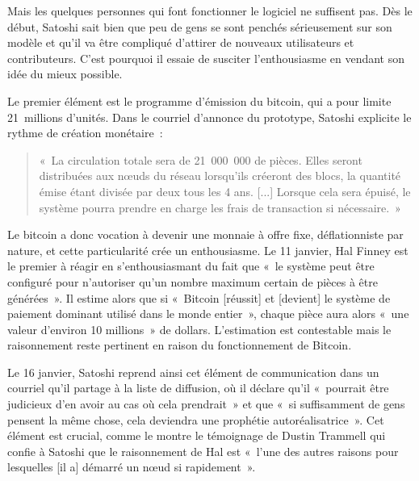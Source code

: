 

Mais les quelques personnes qui font fonctionner le logiciel ne suffisent pas. Dès le début, Satoshi sait bien que peu de gens se sont penchés sérieusement sur son modèle et qu'il va être compliqué d'attirer de nouveaux utilisateurs et contributeurs. C'est pourquoi il essaie de susciter l'enthousiasme en vendant son idée du mieux possible.


Le premier élément est le programme d'émission du bitcoin, qui a pour limite 21~millions d'unités. Dans le courriel d'annonce du prototype, Satoshi explicite le rythme de création monétaire~:

\begin{quote}
«~La circulation totale sera de 21~000~000 de pièces. Elles seront distribuées aux nœuds du réseau lorsqu'ils créeront des blocs, la quantité émise étant divisée par deux tous les 4 ans. [...] Lorsque cela sera épuisé, le système pourra prendre en charge les frais de transaction si nécessaire.~»
\end{quote}

Le bitcoin a donc vocation à devenir une monnaie à offre fixe, déflationniste par nature, et cette particularité crée un enthousiasme. Le 11 janvier, Hal Finney est le premier à réagir en s'enthousiasmant du fait que «~le système peut être configuré pour n'autoriser qu'un nombre maximum certain de pièces à être générées~». Il estime alors que si «~Bitcoin [réussit] et [devient] le système de paiement dominant utilisé dans le monde entier~», chaque pièce aura alors «~une valeur d'environ 10 millions~» de dollars. L'estimation est contestable mais le raisonnement reste pertinent en raison du fonctionnement de Bitcoin.

Le 16 janvier, Satoshi reprend ainsi cet élément de communication dans un courriel qu'il partage à la liste de diffusion, où il déclare qu'il «~pourrait être judicieux d'en avoir au cas où cela prendrait~» et que «~si suffisamment de gens pensent la même chose, cela deviendra une prophétie autoréalisatrice~». Cet élément est crucial, comme le montre le témoignage de Dustin Trammell qui confie à Satoshi que le raisonnement de Hal est «~l'une des autres raisons pour lesquelles [il a] démarré un nœud si rapidement~».

